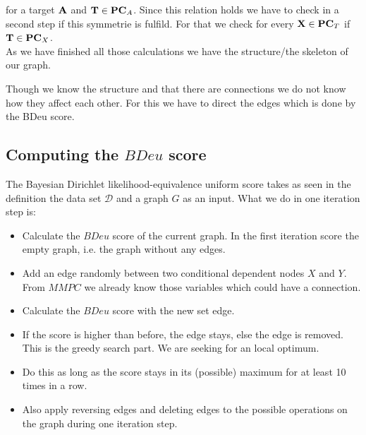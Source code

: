 			for a target ${\textbf{A}}$ and ${\textbf{T}} \in {\textbf{PC}}_{A}$. Since this relation holds we have to check in a second step if this symmetrie is fulfild. For that we check for every ${\textbf{X}} \in {\textbf{PC}}_{T}$ if ${\textbf{T}} \in {\textbf{PC}}_{X}$.\\

			As we have finished all those calculations we have the structure/the skeleton of our graph.
			
			 \label{img.skeleton}

			Though we know the structure and that there are connections we do not know how they affect each other. For this we have to direct the edges which is done by the BDeu score.

		\subsection{Computing the $BDeu$ score}

			The Bayesian Dirichlet likelihood-equivalence uniform score takes as seen in the definition the data set $\mathcal{D}$ and a graph $G$ as an input. What we do in one iteration step is:

			\begin{itemize}
				\item Calculate the $BDeu$ score of the current graph. In the first iteration score the empty graph, i.e. the graph without any edges.
				\item Add an edge randomly between two conditional dependent nodes $X$ and $Y$. From $MMPC$ we already know those variables which could have a connection.
				\item Calculate the $BDeu$ score with the new set edge.
				\item If the score is higher than before, the edge stays, else the edge is removed. This is the greedy search part. We are seeking for an local optimum.
				\item Do this as long as the score stays in its (possible) maximum for at least 10 times in a row.
				\item Also apply reversing edges and deleting edges to the possible operations on the graph during one iteration step.
			\end{itemize}


			 \label{img.empty}


